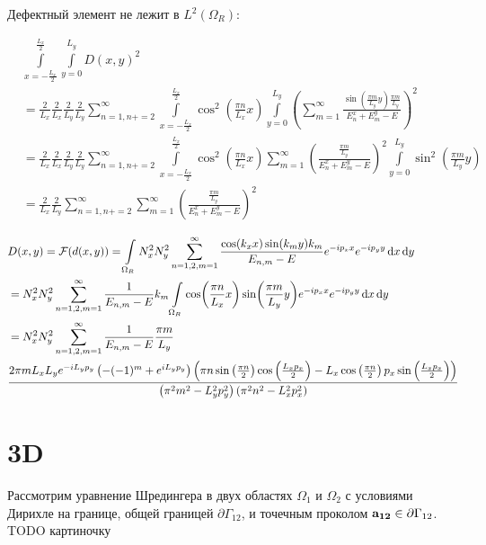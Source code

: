 Дефектный элемент не лежит в $L^2(\Omega_R)$:

\begin{align*}
& \int\limits_{x = -\frac{L_x}{2}}^{\frac{L_x}{2}} \int\limits_{y = 0}^{L_y} D(x, y)^2 \\
& = \frac{2}{L_x} \frac{2}{L_x} \frac{2}{L_y} \frac{2}{L_y}  \sum\limits_{n = 1, n += 2}^\infty
\int\limits_{x = -\frac{L_x}{2}}^{\frac{L_x}{2}} \cos^2(\frac{\pi n}{L_x} x) \int\limits_{y = 0}^{L_y}
\left( \sum\limits_{m = 1}^\infty \frac{\sin(\frac{\pi m}{L_y}y) \frac{\pi m}{L_y}}{E_n^x + E_m^y - E} \right)^2 \\
& = \frac{2}{L_x} \frac{2}{L_x} \frac{2}{L_y} \frac{2}{L_y}  \sum\limits_{n = 1, n += 2}^\infty
\int\limits_{x = -\frac{L_x}{2}}^{\frac{L_x}{2}} \cos^2(\frac{\pi n}{L_x} x)
\sum\limits_{m = 1}^\infty \left( \frac{\frac{\pi m}{L_y}}{E_n^x + E_m^y - E} \right)^2 \int\limits_{y = 0}^{L_y} \sin^2(\frac{\pi m}{L_y}y) \\
& = \frac{2}{L_x} \frac{2}{L_y}  \sum\limits_{n = 1, n += 2}^\infty
\sum\limits_{m = 1}^\infty \left( \frac{\frac{\pi m}{L_y}}{E_n^x + E_m^y - E} \right)^2
\end{align*}

\begin{align*}
& D(x, y) = \mathcal{F}(d(x, y)) = \int\limits_{\Omega_R} N_x^2 N_y^2 \sum\limits_{n = 1,2, m = 1}^\infty \frac{\cos(k_x x) \sin(k_m y) k_m}{E_{n, m} - E} e^{-i p_x x} e^{-i p_y y} \dd{x} \dd{y} \\
& = N_x^2 N_y^2 \sum\limits_{n = 1,2, m = 1}^\infty \frac{1}{E_{n, m} - E} k_m \int\limits_{\Omega_R} \cos(\frac{\pi n}{L_x} x) \sin(\frac{\pi m}{L_y} y) e^{-i p_x x} e^{-i p_y y} \dd{x} \dd{y} \\
& = N_x^2 N_y^2 \sum\limits_{n = 1,2, m = 1}^\infty \frac{1}{E_{n, m} - E} \frac{\pi m}{L_y} \\
& \frac{2 \pi  m L_x L_y e^{-i L_y p_y} \left(-(-1)^m+e^{i L_y p_y}\right) \left(\pi  n \sin \left(\frac{\pi  n}{2}\right) \cos \left(\frac{L_x p_x}{2}\right)-L_x \cos \left(\frac{\pi  n}{2}\right) p_x \sin \left(\frac{L_x p_x}{2}\right)\right)}{\left(\pi ^2 m^2-L_y^2 p_y^2\right) \left(\pi ^2 n^2-L_x^2 p_x^2\right)}
\end{align*}


\section{3D}
Рассмотрим уравнение Шредингера в двух областях $\Omega_1$ и $\Omega_2$ с условиями Дирихле на границе, общей границей $\partial \Gamma_{12}$, и точечным проколом $\vb{a_{12}} \in \partial \Gamma_{12}$. TODO картиночку

